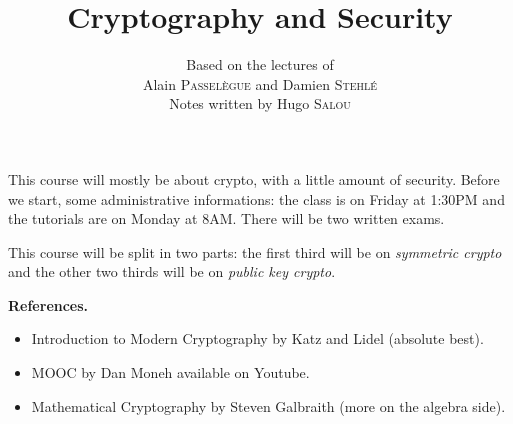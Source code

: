 \documentclass{../notes-en}
\title{Cryptography and Security}
\author{Based on the lectures of\\ Alain \textsc{Passelègue} and Damien \textsc{Stehlé} \\ Notes written by Hugo \textsc{Salou}}
\begin{document}
  \maketitle

  \dominitoc
  \tableofcontents

  \pagebreak

  This course will mostly be about crypto, with a little amount of security.
  Before we start, some administrative informations: the class is on Friday at 1:30PM and the tutorials are on Monday at 8AM.
  There will be two written exams.

  This course will be split in two parts: the first third will be on \textit{symmetric crypto} and the other two thirds will be on \textit{public key crypto}.

  \textbf{References.}
  \begin{itemize}
    \item Introduction to Modern Cryptography by Katz and Lidel (absolute best).
    \item MOOC by Dan Moneh available on Youtube.
    \item Mathematical Cryptography by Steven Galbraith (more on the algebra side).
  \end{itemize}

  
  
\end{document}
